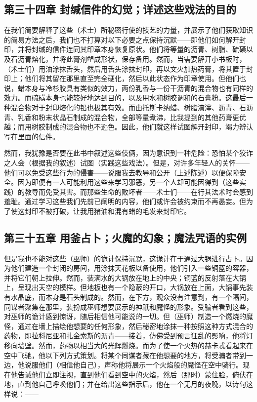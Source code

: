 
\subsection{第三十四章 封缄信件的幻觉；详述这些戏法的目的}

在我们简要解释了这些（术士）所秘密行使的技艺的力量，并展示了他们获取知识的简易方法之后，我们也不打算对以下必要之点保持沉默——即他们如何解开封印，并将封缄的信件连同其印章本身恢复原状。他们将等量的沥青、树脂、硫磺以及石沥青熔化，并将此膏剂塑成形状，保存备用。然而，当需要解开小书板时，（术士们）用油涂抹舌头，然后用舌头涂抹封印，再以文火加热药膏，将其置于封印上；他们将其留在那里直至完全硬化，然后以此状态作为印章使用。但他们也说，蜡本身与冷杉胶具有类似的效力，两份乳香与一份干沥青的混合物也有同样的效力。而硫磺本身也能较好地达到目的，以及用水和树胶调和的石膏粉。这最后一种混合物对于封印熔化的铅也极其有效。而由托斯卡纳蜡、树脂渣滓、沥青、石沥青、乳香和粉末状晶石制成的混合物，全部等量煮沸，比我提到的其他药膏更优越；而用树胶制成的混合物也不逊色。因此，他们就这样试图解开封印，竭力辨认写在里面的信件。\par

然而，我犹豫是否要在此书中叙述这些伎俩，因为意识到一种危险：恐怕某个狡诈之人会（根据我的叙述）试图（实践这些戏法）。但是，对许多年轻人的关怀——他们可以免受这些行为的侵害——说服我去教导和公开（上述陈述）以便保障安全。因为即便有一人可能利用这些来学习邪恶，另一个人却可能因得到（这些实践）的教导而免受其害。而那些生命的败坏者——术士们——在行其法术时会感到羞耻。通过学习这些我们先前已阐明的内容，他们或许会被约束而不再愚妄。但为了使这封印不被打破，让我用猪油和混有蜡的毛发来封印它。\par


\subsection{第三十五章 用釜占卜；火魔的幻象；魔法咒语的实例}

但是我也不能对这些（巫师）的诡计保持沉默，这诡计在于通过大锅进行占卜。因为他们建造一个封闭的房间，用涂抹天花板以备使用，他们引入一些铜蓝的容器，并将它们朝上拉伸。然而，装满水的大锅放在地上的中央；铜蓝的反射落在大锅上，呈现出天空的模样。但地板也有一个隐蔽的开口，大锅放在上面，大锅事先装有水晶底，而本身是石头制成的。然而，在下方，观众没有注意到，有一个隔间，同谋者聚集在那里，装扮成巫师想要展示的神祇和魔怪的形象。受骗者看到这些，对巫师的诡计感到惊讶，随后相信他可能说的一切。但（巫师）制造一个燃烧的魔怪，通过在墙上描绘他想要的任何形象，然后秘密地涂抹一种按照这种方式混合的药物，即拉科尼亚和扎金索斯的沥青——接着，仿佛受到预言狂乱的影响，他将灯移向墙壁。然而，药物以相当大的光辉燃烧。而为了使一个火热的赫卡忒看起来在空中飞驰，他以下列方式策划。将某个同谋者藏在他想要的地方，将受骗者带到一边，他说服他们（相信他自己），声称他将展示一个火焰般的魔怪在空中骑行。现在他告诫他们立即注视，直到他们看到空中的火焰，然后（那时）蒙住脸，俯伏在地，直到他自己呼唤他们；并在给出这些指示后，他在一个无月的夜晚，以诗句这样说：——\par

